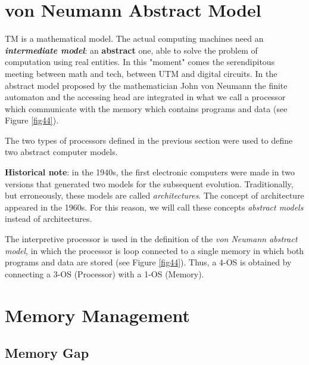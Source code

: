 \section{von Neumann Abstract Model}

TM is a mathematical model. The actual computing machines need an {\bf {\em intermediate model}}: an {\bf abstract} one, able to solve the problem of computation using real entities. In this "moment" comes the  serendipitous  meeting between math and tech, between UTM and digital circuits. In the abstract model proposed by the mathematician John von Neumann the finite automaton and the accessing head are integrated in what we call a processor which communicate with the memory which contains  programs and data (see Figure \ref{fig44}). 


The two types of processors defined in the previous section were used to define two abstract computer models.

\smallskip

{\bf Historical note}: in the 1940s, the first electronic computers were made in two versions that generated two models for the subsequent evolution. Traditionally, but erroneously, these models are called {\em architectures}. The concept of architecture appeared in the 1960s. For this reason, we will call these concepts {\em abstract models} instead of architectures.

\smallskip



The interpretive processor is used in the definition of the {\em von Neumann abstract model}, in which the processor is loop connected to a single memory in which both programs and data are stored (see Figure \ref{fig44}). Thus, a 4-OS is obtained by connecting a 3-OS (Processor) with a 1-OS (Memory).

\section{Memory Management}

\subsection{Memory Gap}\label{memGap}

